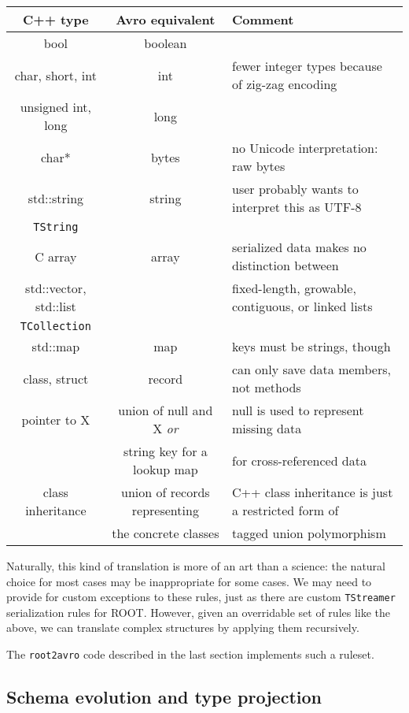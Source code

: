 \documentclass{article}
\begin{document}
\noindent\begin{center}
\begin{tabular}{c c l}
C++ type & Avro equivalent & Comment \\\hline\hline
bool & boolean & \\\hline
char, short, int & int  & fewer integer types because of zig-zag encoding \\\hline
unsigned int, long & long & \\\hline
char* & bytes & no Unicode interpretation: raw bytes \\\hline
std::string & string & user probably wants to interpret this as UTF-8 \\
{\tt TString} & & \\\hline
C array & array & serialized data makes no distinction between \\
std::vector, std::list & & fixed-length, growable, contiguous, or linked lists \\
{\tt TCollection} & & \\\hline
std::map & map & keys must be strings, though \\\hline
class, struct & record & can only save data members, not methods \\\hline
pointer to X & union of null and X {\it or} & null is used to represent missing data \\
& string key for a lookup map & for cross-referenced data \\\hline
class inheritance & union of records representing & C++ class inheritance is just a restricted form of \\
& the concrete classes & tagged union polymorphism \\
\end{tabular}
\end{center}

Naturally, this kind of translation is more of an art than a science: the natural choice for most cases may be inappropriate for some cases. We may need to provide for custom exceptions to these rules, just as there are custom {\tt TStreamer} serialization rules for ROOT. However, given an overridable set of rules like the above, we can translate complex structures by applying them recursively.

The {\tt root2avro} code described in the last section implements such a ruleset.

\subsection*{Schema evolution and type projection}
\end{document}
